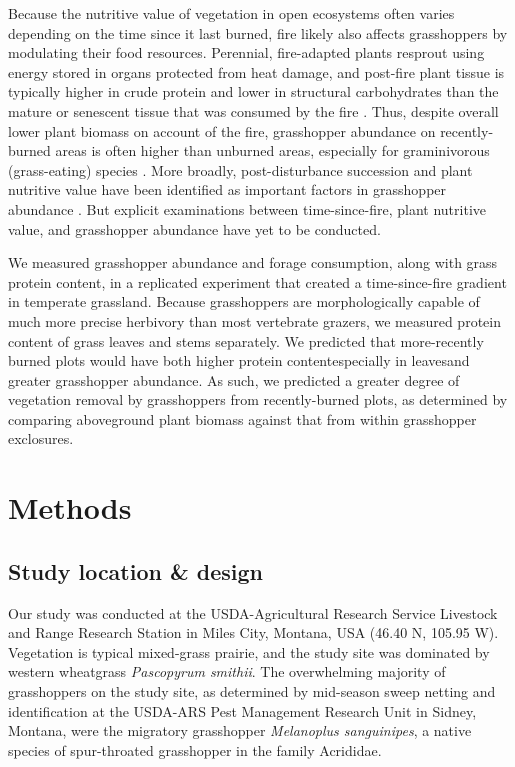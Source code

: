 \documentclass[referee, 
	            sn-basic]
           {sn-jnl}
\begin{document}
\begin{linenumbers}
Because the nutritive value of vegetation in open ecosystems often varies depending on the time since it last burned, fire likely also affects grasshoppers by modulating their food resources. 
Perennial, fire-adapted plants resprout using energy stored in organs protected from heat damage, and post-fire plant tissue is typically higher in crude protein and lower in structural carbohydrates than the mature or senescent tissue that was consumed by the fire \citep{mcgranahan2021}. 
Thus, despite overall lower plant biomass on account of the fire, grasshopper abundance on recently-burned areas is often higher than unburned areas, especially for graminivorous  (grass-eating) species \citep{meyer2002}. 
More broadly, post-disturbance succession and plant nutritive value have been identified as important factors in grasshopper abundance \citep{fartmann2012, schirmel2019}. 
But explicit examinations between time-since-fire, plant nutritive value, and grasshopper abundance have yet to be conducted. 

We measured grasshopper abundance and forage consumption, along with grass protein content, in a replicated experiment that created a time-since-fire gradient in temperate grassland.  
Because grasshoppers are morphologically capable of much more precise herbivory than most vertebrate grazers, we measured protein content of grass leaves and stems separately.
We predicted that more-recently burned plots would have both higher protein content\textemdash especially in leaves\textemdash and greater grasshopper abundance. 
As such, we predicted a greater degree of vegetation removal by grasshoppers from recently-burned plots, as determined by comparing aboveground plant biomass against that from within grasshopper exclosures. 

\section{Methods}

\subsection{Study location \& design} 

Our study was conducted at the USDA-Agricultural Research Service Livestock and Range Research Station in Miles City, Montana, USA (46.40 N, 105.95 W).  
Vegetation is typical mixed-grass prairie, and the study site was dominated by western wheatgrass \emph{Pascopyrum smithii}.  
The overwhelming majority of grasshoppers on the study site, as determined by mid-season sweep netting and identification at the USDA-ARS Pest Management Research Unit in Sidney, Montana, were the migratory grasshopper \emph{Melanoplus sanguinipes}, a native species of spur-throated grasshopper in the family Acrididae. 


\end{linenumbers}
\end{document}
